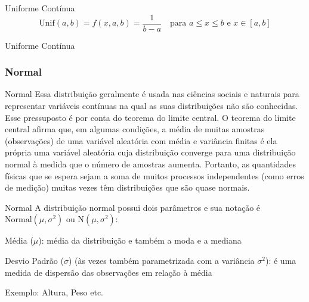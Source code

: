 \begin{frame}{Uniforme Contínua}
	$$\text{Unif}(a,b) = f(x, a, b) = \frac{1}{b-a} \quad \text{para $a \leq x \leq b$ e $x \in [a, b]$}$$
\end{frame}

\begin{frame}{Uniforme Contínua}
	\centering
\end{frame}

\subsubsection{Normal}
\begin{frame}{Normal}
	Essa distribuição geralmente é usada nas ciências sociais e naturais para
	representar variáveis contínuas na qual as suas distribuições não são conhecidas.
	Esse pressuposto é por conta do teorema do limite central. O teorema do limite
	central afirma que, em algumas condições, a média de muitas amostras (observações)
	de uma variável aleatória com média e variância finitas é ela própria uma variável
	aleatória cuja distribuição converge para uma distribuição normal à medida que o
	número de amostras aumenta.
	\vfill
	Portanto, as quantidades físicas que se espera sejam a
	soma de muitos processos independentes (como erros de medição) muitas vezes têm
	distribuições que são quase normais.
\end{frame}

\begin{frame}{Normal}
	A distribuição normal possui dois parâmetros e sua notação é
	$\text{Normal}(\mu, \sigma^2)$ ou $\text{N}(\mu, \sigma^2)$:
	\begin{vfilleditems}
		\item Média ($\mu$): média da distribuição e também a moda e a mediana
		\item Desvio Padrão ($\sigma$) (às vezes também parametrizada com a variância $\sigma^2$): é uma medida de dispersão das observações em relação à média
	\end{vfilleditems}
	\vfill
	Exemplo: Altura, Peso etc.
\end{frame}

